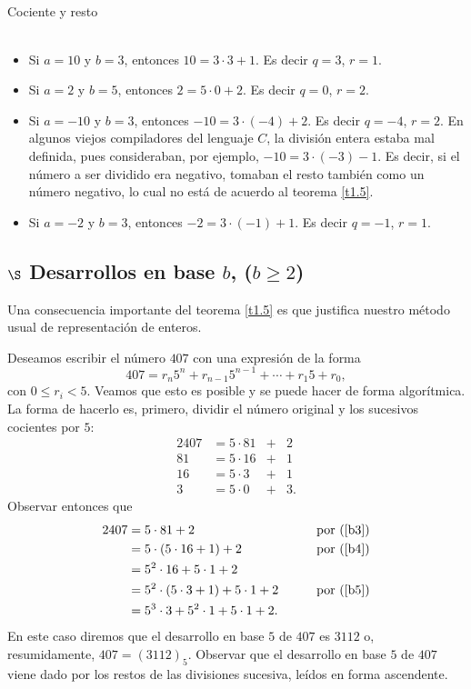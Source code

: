 \begin{section}{Cociente y resto}
\begin{ejemplo*} ${}^{}$ 

\begin{itemize}
\item Si $a=10$ y $b=3$, entonces $10 = 3 \cdot 3 +1$. Es decir $q= 3$, $r=1$. 
\item Si $a=2$ y $b=5$, entonces $2 = 5 \cdot 0 +2$. Es decir $q= 0$, $r=2$. 
\item Si $a=-10$ y $b=3$, entonces $-10 = 3 \cdot (-4) +2$. Es decir $q= -4$, $r=2$. En algunos viejos compiladores del lenguaje $C$, la división entera estaba mal definida, pues consideraban, por ejemplo, $-10 = 3 \cdot (-3) -1$. Es decir, si el número a ser dividido era negativo, tomaban el resto también como un número negativo, lo cual no está de acuerdo al teorema \ref{t1.5}.  
\item Si $a=-2$ y $b=3$, entonces $-2 = 3 \cdot (-1) +1$. Es decir $q= -1$, $r=1$. 
\end{itemize}
\end{ejemplo*}

\subsection*{$\S$ Desarrollos en base $b$, ($b \ge 2$)}
    
    
Una consecuencia importante del teorema \ref{t1.5} es que
justifica nuestro método usual de representación de enteros. 

\begin{ejemplo*} Deseamos escribir el número $407$ con una expresión de la forma 
$$
407 = r_n5^n +r_{n-1} 5^{n-1}+\cdots + r_1 5 + r_0,
$$
con $0 \le r_i < 5$. Veamos que esto es posible y se puede hacer de forma algorítmica. La forma de hacerlo  es, primero, dividir el número original y los sucesivos cocientes por $5$:  
\begin{alignat}2
407 &=5\cdot 81 &+& 2 \label{b3}\\
81 & = 5\cdot 16 &+& 1  \label{b4}\\
16 & = 5\cdot 3 &+& 1  \label{b5}\\
3 & = 5\cdot 0 &+& 3.
\end{alignat}
Observar entonces que
\begin{alignat*}2
407 &=5\cdot 81 + 2  &\qquad& \text{por (\ref{b3})}\\
 &= 5\cdot (5\cdot 16 + 1) + 2  &\qquad& \text{por (\ref{b4})}\\
 &= 5^2 \cdot 16+ 5\cdot 1 + 2 &\qquad& \text{}\\
 &= 5^2 \cdot (5\cdot 3 + 1)+ 5\cdot 1 + 2   &\qquad& \text{por (\ref{b5})}\\
 &= 5^3 \cdot 3+ 5^2 \cdot 1 + 5\cdot 1 + 2.  &\qquad& \text{}
\end{alignat*}
En este caso diremos que el desarrollo en base $5$ de $407$ es $3112$ o, resumidamente, $407 = (3112)_5$.  Observar que el desarrollo en base $5$ de $407$ viene dado por los restos de las divisiones sucesiva, leídos en forma ascendente.
\end{ejemplo*}



\end{section}

